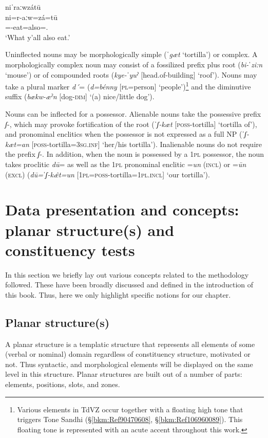 \documentclass[output=paper]{langscibook}
\begin{document}
\ea\label{bkm:Ref83741883}
{niˈraːwzátū} \\
\gll ni=r-aːw=zá=tū\\
\Sub{}=\Hab{}-eat=also=\Second\Pl{}.\Inf{}\\
\glt `What y'all also eat.'
\z

Uninflected nouns may be morphologically simple (ˈ\textit{gæt} `tortilla') or complex. A morphologically complex noun may consist of a fossilized prefix plus root (\textit{bi-ˈzi:n} `mouse') or of compounded roots (\textit{kye-ˈyuˀ} [head.of-building] `roof'). Nouns may take a plural marker \textit{d´}= (\textit{d=bénny} [\textsc{pl}=person] `people')\footnote{Various elements in TdVZ occur together with a floating high tone that triggers Tone Sandhi (§\ref{bkm:Ref90470608}, §\ref{bkm:Ref106960089}). This floating tone is represented with an acute accent throughout this work.} and the diminutive suffix (\textit{bækw-æˀn} [dog-\textsc{dim}] `(a) nice/little dog').

Nouns can be inflected for a possessor. Alienable nouns take the possessive prefix \textit{ʃ}-, which may provoke fortification of the root (\textit{ˈʃ{}-kæt} [\textsc{poss}-tortilla] `tortilla of'), and pronominal enclitics when the possessor is not expressed as a full NP (ˈ\textit{ʃ{}-kæt=an} [\textsc{poss}-tortilla=\textsc{3sg.inf}] `her/his tortilla'). Inalienable nouns do not require the prefix \textit{ʃ}-. In addition, when the noun is possessed by a \textsc{1pl} possessor, the noun takes proclitic \textit{dū}= as well as the \textsc{1pl} pronominal enclitic =\textit{un} (\textsc{incl}) or =\textit{ūn} (\textsc{excl)} (\textit{dū=ˈʃ{}-k\^{æ}t=un} [\textsc{1pl=poss}-tortilla=\textsc{1pl.incl}] `our tortilla'). 


\section{Data presentation and concepts: planar structure(s) and constituency tests}

In this section we briefly lay out various concepts related to the methodology followed. These have been broadly discussed and defined in the introduction of this book. Thus, here we only highlight specific notions for our chapter.

\subsection{Planar structure(s)} 

A planar structure is a templatic structure that represents all elements of some (verbal or nominal) domain regardless of constituency structure, motivated or not. Thus syntactic, and morphological elements will be displayed on the same level in this structure. Planar structures are built out of a number of parts: elements, positions, slots, and zones. 
\end{document}
